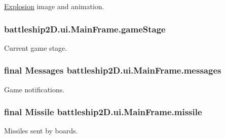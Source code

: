 \hyperlink{classbattleship2D_1_1ui_1_1Explosion}{Explosion} image and animation. 

\hypertarget{classbattleship2D_1_1ui_1_1MainFrame_a0a2301fb85fa1a17ebcb5e196d441dc0}{
\subsubsection[{game\-Stage}]{ battleship2\-D.\-ui.\-Main\-Frame.\-game\-Stage\hspace{0.3cm}{\ttfamily [private]}}}\label{classbattleship2D_1_1ui_1_1MainFrame_a0a2301fb85fa1a17ebcb5e196d441dc0}


Current game stage. 

\hypertarget{classbattleship2D_1_1ui_1_1MainFrame_abc1c8957486a32014fae369c0132e5e4}{
\subsubsection[{messages}]{\setlength{\rightskip}{0pt plus 5cm}final {\bf Messages} battleship2\-D.\-ui.\-Main\-Frame.\-messages\hspace{0.3cm}{\ttfamily [private]}}}\label{classbattleship2D_1_1ui_1_1MainFrame_abc1c8957486a32014fae369c0132e5e4}


Game notifications. 

\hypertarget{classbattleship2D_1_1ui_1_1MainFrame_aecfa71650afad9e252e9920a52c0919d}{
\subsubsection[{missile}]{\setlength{\rightskip}{0pt plus 5cm}final {\bf Missile} battleship2\-D.\-ui.\-Main\-Frame.\-missile\hspace{0.3cm}{\ttfamily [private]}}}\label{classbattleship2D_1_1ui_1_1MainFrame_aecfa71650afad9e252e9920a52c0919d}


Missiles sent by boards. 

